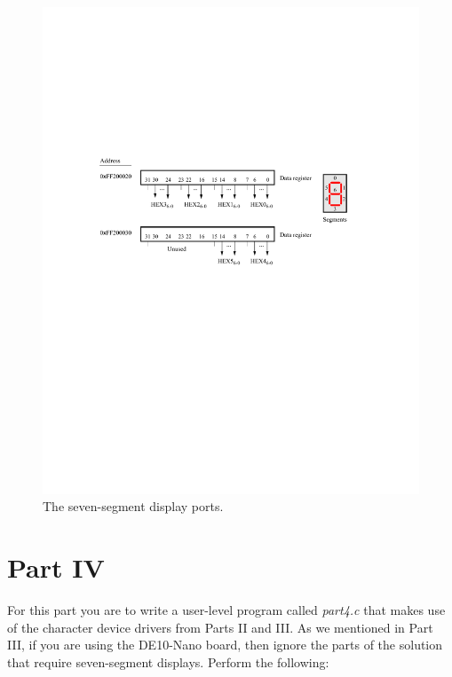 \documentclass[epsfig,10pt,fullpage]{article}
\begin{document}
\begin{figure}[H]
   \begin{center}
       \includegraphics{figures/fig_segment_port.pdf}
   \end{center}
    \caption{The seven-segment display ports.}
\label{fig:HEX}
\end{figure}

\section*{Part IV}
\noindent
For this part you are to write a user-level program called {\it part4.c} that makes use of the 
character device drivers from Parts II and III. As we mentioned in Part III, if you are
using the DE10-Nano board, then ignore the parts of the solution that require
seven-segment displays. Perform the following:
\end{document}
